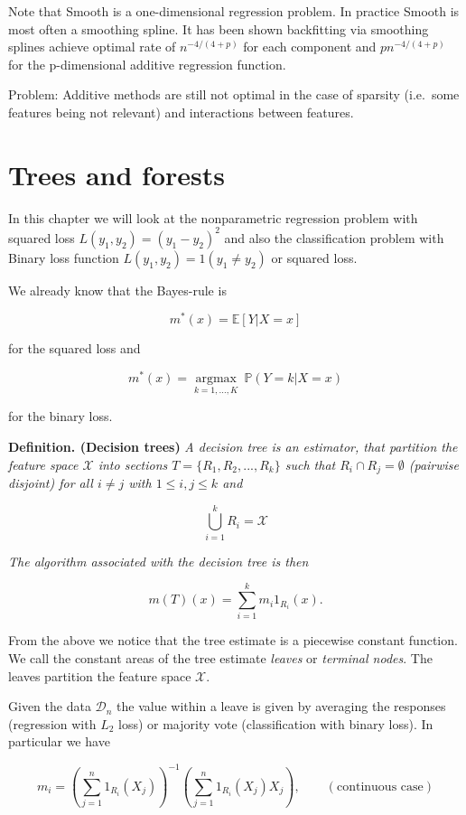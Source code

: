 \documentclass[
]{book}
\begin{document}
Note that Smooth is a one-dimensional regression problem. In practice Smooth is most often a smoothing spline.
It has been shown backfitting via smoothing splines achieve optimal rate of \(n^{-4/(4+p)}\) for each component and \(pn^{-4/(4+p)}\) for the p-dimensional additive regression function.

Problem: Additive methods are still not optimal in the case of sparsity (i.e.~some features being not relevant) and interactions between features.

\hypertarget{trees-and-forests}{%
\section{Trees and forests}\label{trees-and-forests}}

In this chapter we will look at the nonparametric regression problem with squared loss \(L(y_1,y_2)=(y_1-y_2)^2\) and also the classification problem with Binary loss function \(L(y_1,y_2)= 1(y_1\neq y_2)\) or squared loss.

We already know that the Bayes-rule is

\[
m^\ast(x)=\mathbb E[Y|X=x]
\]

for the squared loss and

\[
m^\ast(x)=\underset{k=1,\dots,K}{\operatorname{argmax}}\ \mathbb P(Y=k|X=x)
\]

for the binary loss.

\textbf{Definition. (Decision trees)} \emph{A decision tree is an estimator, that partition the feature space \(\mathcal X\) into sections \(T=\{R_1,R_2,...,R_k\}\) such that \(R_i\cap R_j=\emptyset\) (pairwise disjoint) for all \(i\ne j\) with \(1\le i,j\le k\) and}

\[
\bigcup_{i=1}^kR_i=\mathcal X
\]

\emph{The algorithm associated with the decision tree is then}

\[
m(T)(x)=\sum_{i=1}^k m_i 1_{R_i}(x).
\]

From the above we notice that the tree estimate is a piecewise constant function. We call the constant areas of the tree estimate \emph{leaves} or \emph{terminal nodes}. The leaves partition the feature space \(\mathcal X\).

Given the data \(\mathcal D_n\) the value within a leave is given by averaging the responses (regression with \(L_2\) loss) or majority vote (classification with binary loss). In particular we have

\[
m_i=\left(\sum_{j=1}^n1_{R_i}(X_j)\right)^{-1}\left(\sum_{j=1}^n1_{R_i}(X_j)X_j\right),\qquad (\text{continuous case})
\]
\end{document}
